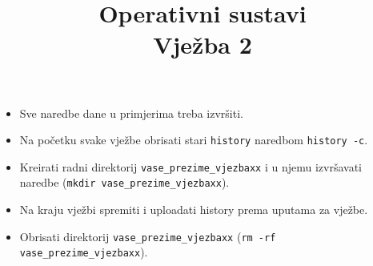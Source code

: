 \documentclass[a4paper,12pt]{article}
\title
{Operativni sustavi\\
Vježba 2}
\date{}
\begin{document}
\maketitle
\begin{itemize}
\item Sve naredbe dane u primjerima treba izvršiti.
\item Na početku svake vježbe obrisati stari \texttt{history} naredbom \texttt{history -c}.
\item Kreirati radni direktorij \texttt{vase\_prezime\_vjezbaxx} i u njemu izvršavati naredbe (\lstinline!mkdir vase_prezime_vjezbaxx!).
 \item Na kraju vježbi spremiti i uploadati history prema uputama za vježbe.
 \item Obrisati direktorij \texttt{vase\_prezime\_vjezbaxx} (\lstinline!rm -rf vase_prezime_vjezbaxx!).
\end{itemize}

\end{document}

